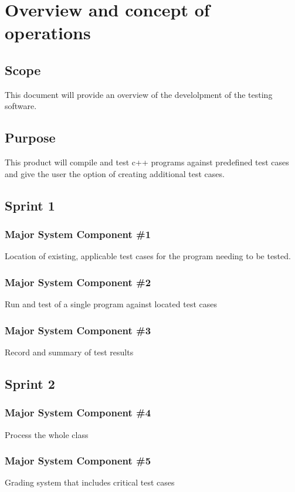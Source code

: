 
\chapter{Overview and concept of operations}

\section{Scope}
This document will provide an overview of the develolpment of the testing software.


\section{Purpose}
This product will compile and test c++ programs against predefined test cases and give the user the option of creating additional test cases.

\section{Sprint 1}

\subsection{Major System Component \#1}
Location of existing, applicable test cases for the program needing to be tested.

\subsection{Major System Component \#2}
Run and test of a single program against located test cases

\subsection{Major System Component \#3}
Record and summary of test results

\section{Sprint 2}

\subsection{Major System Component \#4}
Process the whole class

\subsection{Major System Component \#5}
Grading system that includes critical test cases

